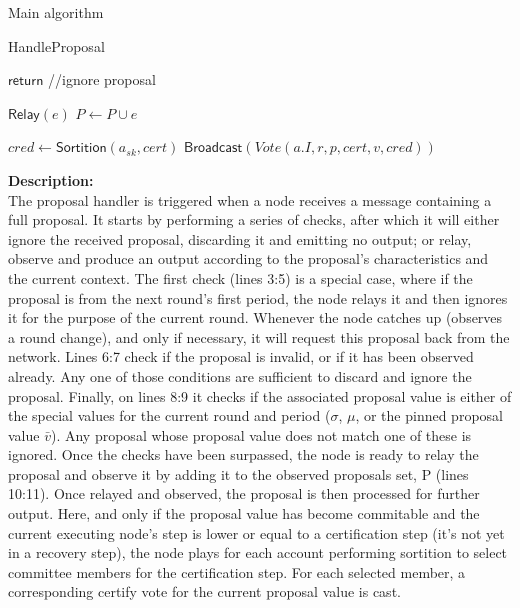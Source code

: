 \documentclass[10pt,a4paper]{article}
\begin{document}
\begin{section}{Main algorithm}
\begin{subsection}{HandleProposal}
\begin{algorithm}[H]
\begin{algorithmic}[1]
                \State $\mathsf{return}$ //ignore proposal
            \EndIf

            \State $\mathsf{Relay}(e)$
            \State $P \gets P \cup e$

                    \State $cred \gets 
                    \mathsf{Sortition}(a_{sk}, cert)$
                        \State $\mathsf{Broadcast}(Vote(a.I, r, p, cert, v,  cred))$
                    \EndIf
                \EndFor    
            \EndIf

        \EndFunction
        \end{algorithmic}
        \caption{\underline{HandleProposal}}
    \end{algorithm}
    
    
    \noindent \textbf{Description:}\\
The proposal handler is triggered when a node receives a message containing a full proposal.
It starts by performing a series of checks, after which it will either ignore the received
proposal, discarding it and emitting no output; or relay, observe and produce an output
according to the proposal's characteristics and the current context.
The first check (lines 3:5) is a special case, where if the proposal is from the next round's 
first period, the node relays it and then ignores it for the purpose of the current round. 
Whenever the node catches up (observes a round change), and only if necessary, it will request 
this proposal back from the network.
Lines 6:7 check if the proposal is invalid, or if it has been observed already. Any one of those
conditions are sufficient to discard and ignore the proposal.
Finally, on lines 8:9 it checks if the associated proposal value is either of the special values for the current
round and period ($\sigma$, $\mu$, or the pinned proposal value $\bar{v}$). Any proposal whose proposal value does not match
one of these is ignored.
Once the checks have been surpassed, the node is ready to relay the proposal and observe it by adding
it to the observed proposals set, P (lines 10:11).
Once relayed and observed, the proposal is then processed for further output.
Here, and only if the proposal value has become commitable and the current executing node's step is lower or equal
to a certification step (it's not yet in a recovery step), the node plays for each account performing sortition
to select committee members for the certification step. For each selected member, a corresponding certify vote for
the current proposal value is cast.



\end{subsection}
\end{section}
\end{document}
